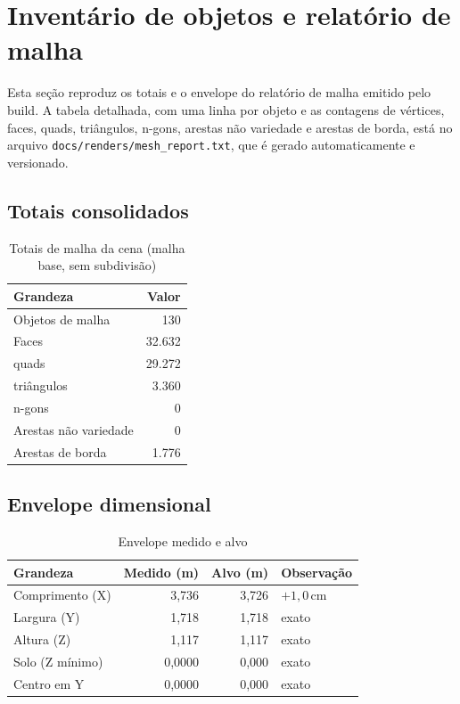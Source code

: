 \chapter{Invent\'ario de objetos e relat\'orio de malha}\label{ap:objetos}

Esta se{\c{c}}\~ao reproduz os totais e o envelope do relat\'orio de malha emitido pelo build.
A tabela detalhada, com uma linha por objeto e as contagens de v\'ertices, faces, quads,
tri\^angulos, n-gons, arestas n\~ao variedade e arestas de borda, est\'a no arquivo
\texttt{docs/renders/mesh\_report.txt}, que \'e gerado automaticamente e versionado.

\section{Totais consolidados}

\begin{table}[htbp]
\centering
\caption{Totais de malha da cena (malha base, sem subdivis\~ao)}
\label{tab:totais-ap}
\footnotesize
\begin{tabular}{>{\raggedright\arraybackslash}p{7.4cm}r}
\toprule
\textbf{Grandeza} & \textbf{Valor} \\
\midrule
Objetos de malha & 130 \\
Faces & 32.632 \\
\quad quads & 29.272 \\
\quad tri\^angulos & 3.360 \\
\quad n-gons & 0 \\
Arestas n\~ao variedade & 0 \\
Arestas de borda & 1.776 \\
\bottomrule
\end{tabular}
\end{table}

\section{Envelope dimensional}

\begin{table}[htbp]
\centering
\caption{Envelope medido e alvo}
\label{tab:envelope-ap}
\footnotesize
\begin{tabular}{>{\raggedright\arraybackslash}p{4.6cm}rr>{\raggedright\arraybackslash}p{4.6cm}}
\toprule
\textbf{Grandeza} & \textbf{Medido (m)} & \textbf{Alvo (m)} & \textbf{Observa{\c{c}}\~ao} \\
\midrule
Comprimento (X) & 3,736 & 3,726 & $+1,0$\,cm \\
Largura (Y) & 1,718 & 1,718 & exato \\
Altura (Z) & 1,117 & 1,117 & exato \\
Solo (Z m\'inimo) & 0,0000 & 0,000 & exato \\
Centro em Y & 0,0000 & 0,000 & exato \\
\bottomrule
\end{tabular}
\end{table}

